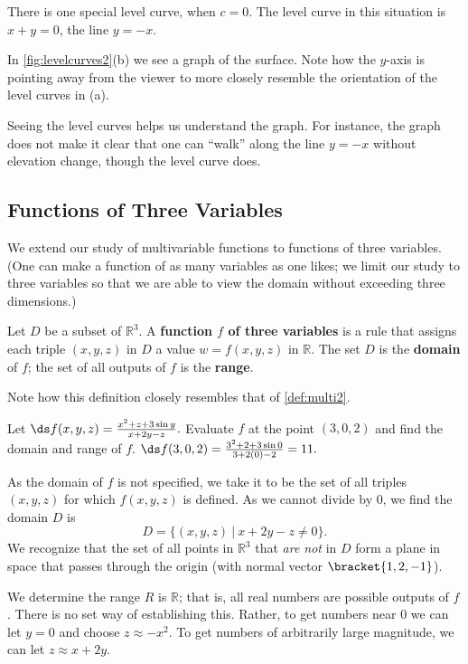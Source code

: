 \begin{example}
There is one special level curve, when $c=0$. The level curve in this situation is $x+y=0$, the line $y=-x$.

In \autoref{fig:levelcurves2}(b) we see a graph of the surface. Note how the $y$-axis is pointing away from the viewer to more closely resemble the orientation of the level curves in (a). 

Seeing the level curves helps us understand the graph. For instance, the graph does not make it clear that one can ``walk'' along the line $y=-x$ without elevation change, though the level curve does.
\end{example}

\subsection{Functions of Three Variables}

We extend our study of multivariable functions to functions of three variables. (One can make a function of as many variables as one likes; we limit our study to three variables so that we are able to view the domain without exceeding three dimensions.)

\begin{definition}\label{def:multi3}%
Let $D$ be a subset of $\mathbb{R}^3$. A \textbf{function $f$ of three variables} is a rule that assigns each triple $(x,y,z)$ in $D$ a value $w=f(x,y,z)$ in $\mathbb{R}$. The set $D$ is the \textbf{domain} of $f$; the set of all outputs of $f$ is the \textbf{range}.
\end{definition}

Note how this definition closely resembles that of \autoref{def:multi2}.

\begin{example}\label{ex_multi3}%
Let $\ds f(x,y,z) =  \frac{x^2+z+3\sin y}{x+2y-z}.$ Evaluate $f$ at the point $(3,0,2)$ and find the domain and range of $f$.
\solution
$\ds f(3,0,2) = \frac{3^2+2+3\sin 0}{3+2(0)-2} = 11.$

As the domain of $f$ is not specified, we take it to be the set of all triples $(x,y,z)$ for which $f(x,y,z)$ is defined. As we cannot divide by $0$, we find the domain $D$ is 
\[D = \{(x,y,z)\ |\ x+2y-z\neq 0\}.\]
We recognize that the set of all points in $\mathbb{R}^3$ that \emph{are not} in $D$ form a plane in space that passes through the origin (with normal vector $\bracket{1,2,-1}$). 

We determine the range $R$ is $\mathbb{R}$; that is, all real numbers are possible outputs of $f$. There is no set way of establishing this. Rather, to get numbers near 0 we can let $y=0$ and choose $z \approx -x^2$. To get numbers of arbitrarily large magnitude, we can let $z\approx x+2y$.
\end{example}

